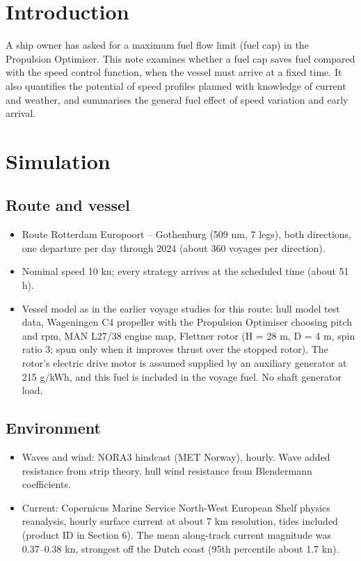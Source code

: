 \documentclass[a4paper,11pt]{article}
\author{Frode Bloch}
\date{\today}
\title{}
\begin{document}
\bvMainTitlePage
\tableofcontents
\newpage

\section{Introduction}
\label{sec:org6feaa8c}

A ship owner has asked for a maximum fuel flow limit (fuel cap) in the
Propulsion Optimiser.  This note examines whether a fuel cap saves fuel
compared with the speed control function, when the vessel must arrive
at a fixed time.  It also quantifies the potential of speed profiles
planned with knowledge of current and weather, and summarises the
general fuel effect of speed variation and early arrival.

\section{Simulation}
\label{sec:org351d012}

\subsection{Route and vessel}
\label{sec:org6d1b91e}

\begin{itemize}
\item Route Rotterdam Europoort -- Gothenburg (509 nm, 7 legs), both
directions, one departure per day through 2024 (about 360 voyages
per direction).
\item Nominal speed 10 kn; every strategy arrives at the scheduled time
(about 51 h).
\item Vessel model as in the earlier voyage studies for this route: hull
model test data, Wageningen C4 propeller with the Propulsion Optimiser
choosing pitch and rpm, MAN L27/38 engine map, Flettner rotor
(H = 28 m, D = 4 m, spin ratio 3; spun only when it improves thrust
over the stopped rotor).  The rotor's electric drive motor is assumed
supplied by an auxiliary generator at 215 g/kWh, and this fuel is
included in the voyage fuel.  No shaft generator load.
\end{itemize}

\subsection{Environment}
\label{sec:org984a405}

\begin{itemize}
\item Waves and wind: NORA3 hindcast (MET Norway), hourly.  Wave added
resistance from strip theory, hull wind resistance from Blendermann
coefficients.
\item Current: Copernicus Marine Service North-West European Shelf physics
reanalysis, hourly surface current at about 7 km resolution, tides
included (product ID in Section 6).  The mean along-track current
magnitude was 0.37--0.38 kn, strongest off the Dutch coast (95th
percentile about 1.7 kn).
\end{itemize}
\end{document}

